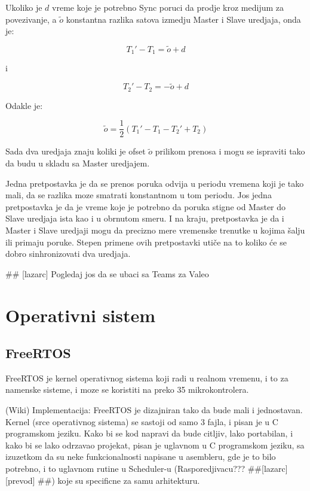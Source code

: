 \documentclass[a4paper,12pt, master]{etf}
\begin{document}
	Ukoliko je $d$ vreme koje je potrebno Sync poruci da prodje kroz medijum za povezivanje, a 
    $\tilde{o}$	konstantna razlika satova izmedju Master i Slave uredjaja, onda je:
    
	\begin{equation}
		T_1' - T_1 = \tilde{o} + d
	\end{equation}

	i

	\begin{equation}
			T_2' - T_2 = -\tilde{o} + d
	\end{equation}

	Odakle je:

	\begin{equation}
		\tilde{o} = \frac{1}{2} (T_1' - T_1 - T_2' + T_2)
	\end{equation}

	Sada dva uredjaja znaju koliki je ofset $\tilde{o}$ prilikom prenosa i mogu se ispraviti 
	tako da budu u skladu sa Master uredjajem.

	Jedna pretpostavka je da se prenos poruka odvija u periodu vremena koji je tako mali, da se
	razlika moze smatrati konstantnom u tom periodu. Jos jedna pretpostavka je da je vreme 
	koje je	potrebno da poruka stigne od Master do Slave uredjaja ista kao i u obrnutom smeru. 
	I na kraju,	pretpostavka je da i Master i Slave uredjaji mogu da precizno mere vremenske 
    trenutke u kojima \v{s}alju ili primaju poruke. Stepen primene ovih pretpostavki uti\v{c}e 
    na to koliko \'{c}e se dobro sinhronizovati dva uredjaja.

    \#\# [lazarc] Pogledaj jos da se ubaci sa Teams za Valeo
    
	\newpage

	\chapter{Operativni sistem}

	\section{FreeRTOS}

	FreeRTOS je kernel operativnog sistema koji radi u realnom vremenu, i to za namenske 
	sisteme, i moze se koristiti na preko 35 mikrokontrolera.

	(Wiki) Implementacija:
	FreeRTOS je dizajniran tako da bude mali i jednostavan. Kernel (srce operativnog sistema) 
	se sastoji od samo 3 fajla, i pisan je u C programskom jeziku. Kako bi se kod napravi da 
	bude citljiv, lako portabilan, i kako bi se lako odrzavao projekat, pisan je uglavnom u C
	programskom jeziku, sa izuzetkom da su neke funkcionalnosti napisane u asembleru, gde je to
	bilo potrebno, i to uglavnom rutine u Scheduler-u (Rasporedjivacu??? \#\#[lazarc] [prevod]
	\#\#) koje su specificne za samu arhitekturu.
\end{document}
